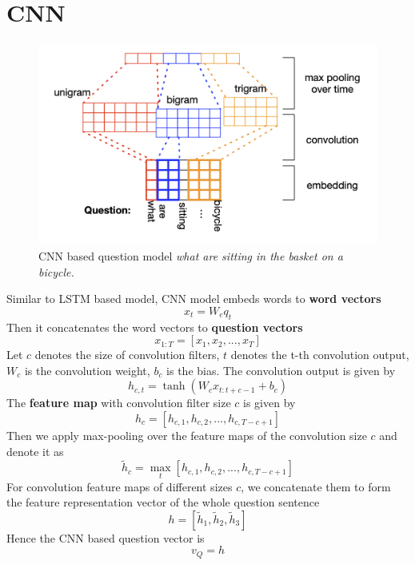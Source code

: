 \section{CNN}

\begin{figure}[h!]
	\centering
	\includegraphics[width=\linewidth]{img/cnn-example}
	\caption{CNN based question model \textit{what are sitting in the basket on a bicycle.} \cite{SAN}}
	\label{fig:cnn-la}
\end{figure}


Similar to LSTM based model, CNN model embeds words to \textbf{word vectors}
\[x_t = W_e q_t \]
Then it concatenates the word vectors to \textbf{question vectors}
\[x_{1:T} = [x_1, x_2, ..., x_T]\]
Let  $ c $ denotes the size of convolution filters, $ t $ denotes the t-th convolution output, $ W_c $ is the convolution weight, $ b_c $ is the bias. The convolution output is given by
\[ h_{c, t} = \tanh(W_cx_{t:t+c-1}  + b_c )\]
The \textbf{feature map} with convolution filter size $ c $ is given by
\[h_c = [h_{c,1}, h_{c,2},..., h_{c, T-c+1}]\]
Then we apply max-pooling over the feature maps of the convolution size $ c $ and denote it as 
\[ \tilde{h}_c = \max_t[h_{c,1}, h_{c,2}, ..., h_{c, T-c+1}] \] 
For convolution feature maps of different sizes $ c $, we concatenate them to form the feature representation vector of the whole question sentence
\[h = [\tilde{h}_1, \tilde{h}_2, \tilde{h}_3]\]
Hence the CNN based question vector is
\[v_Q  = h\]


